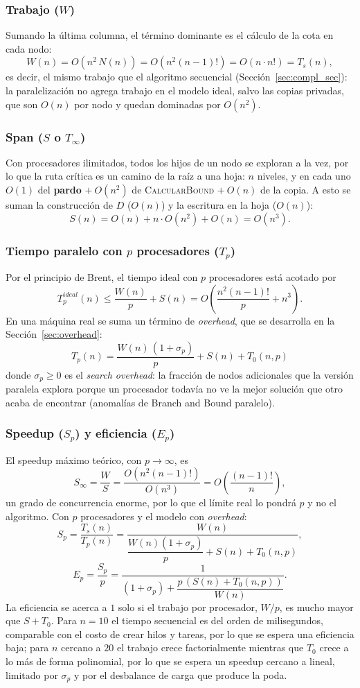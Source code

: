 \documentclass[12pt,a4paper]{article}
\begin{document}
\subsubsection*{Trabajo ($W$)}
Sumando la última columna, el término dominante es el cálculo de la cota en cada nodo:
\[
W(n) = O\left(n^2 \, N(n)\right) = O\left(n^2 (n-1)!\right) = O(n \cdot n!) = T_s(n),
\]
es decir, el mismo trabajo que el algoritmo secuencial (Sección~\ref{sec:compl_sec}): la paralelización no agrega trabajo en el modelo ideal, salvo las copias privadas, que son $O(n)$ por nodo y quedan dominadas por $O(n^2)$.

\subsubsection*{Span ($S$ o $T_\infty$)}
Con procesadores ilimitados, todos los hijos de un nodo se exploran a la vez, por lo que la ruta crítica es un camino de la raíz a una hoja: $n$ niveles, y en cada uno $O(1)$ del \textbf{pardo} $+\ O(n^2)$ de \textsc{CalcularBound} $+\ O(n)$ de la copia. A esto se suman la construcción de $D$ ($O(n)$) y la escritura en la hoja ($O(n)$):
\[
S(n) = O(n) + n \cdot O(n^2) + O(n) = O(n^3).
\]

\subsubsection*{Tiempo paralelo con $p$ procesadores ($T_p$)}
Por el principio de Brent, el tiempo ideal con $p$ procesadores está acotado por
\[
T_p^{ideal}(n) \le \frac{W(n)}{p} + S(n) = O\left(\frac{n^2 (n-1)!}{p} + n^3\right).
\]
En una máquina real se suma un término de \textit{overhead}, que se desarrolla en la Sección~\ref{sec:overhead}:
\[
\boxed{T_p(n) = \frac{W(n)\,(1+\sigma_p)}{p} + S(n) + T_0(n,p)}
\]
donde $\sigma_p \ge 0$ es el \textit{search overhead}: la fracción de nodos adicionales que la versión paralela explora porque un procesador todavía no ve la mejor solución que otro acaba de encontrar (anomalías de Branch and Bound paralelo).

\subsubsection*{Speedup ($S_p$) y eficiencia ($E_p$)}
El speedup máximo teórico, con $p \to \infty$, es
\[
S_\infty = \frac{W}{S} = \frac{O(n^2 (n-1)!)}{O(n^3)} = O\left(\frac{(n-1)!}{n}\right),
\]
un grado de concurrencia enorme, por lo que el límite real lo pondrá $p$ y no el algoritmo. Con $p$ procesadores y el modelo con \textit{overhead}:
\[
S_p = \frac{T_s(n)}{T_p(n)} = \frac{W(n)}{\dfrac{W(n)(1+\sigma_p)}{p} + S(n) + T_0(n,p)},
\]
\[
E_p = \frac{S_p}{p} = \frac{1}{(1+\sigma_p) + \dfrac{p\,\left(S(n) + T_0(n,p)\right)}{W(n)}}.
\]
La eficiencia se acerca a $1$ solo si el trabajo por procesador, $W/p$, es mucho mayor que $S + T_0$. Para $n=10$ el tiempo secuencial es del orden de milisegundos, comparable con el costo de crear hilos y tareas, por lo que se espera una eficiencia baja; para $n$ cercano a $20$ el trabajo crece factorialmente mientras que $T_0$ crece a lo más de forma polinomial, por lo que se espera un speedup cercano a lineal, limitado por $\sigma_p$ y por el desbalance de carga que produce la poda.
\end{document}
